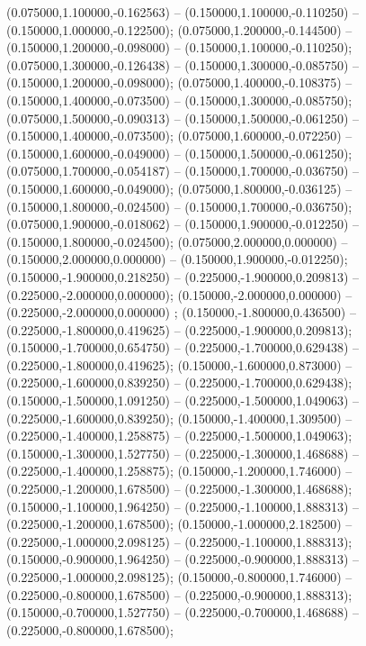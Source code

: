  (0.075000,1.100000,-0.162563) -- (0.150000,1.100000,-0.110250) -- (0.150000,1.000000,-0.122500);
 (0.075000,1.200000,-0.144500) -- (0.150000,1.200000,-0.098000) -- (0.150000,1.100000,-0.110250);
 (0.075000,1.300000,-0.126438) -- (0.150000,1.300000,-0.085750) -- (0.150000,1.200000,-0.098000);
 (0.075000,1.400000,-0.108375) -- (0.150000,1.400000,-0.073500) -- (0.150000,1.300000,-0.085750);
 (0.075000,1.500000,-0.090313) -- (0.150000,1.500000,-0.061250) -- (0.150000,1.400000,-0.073500);
 (0.075000,1.600000,-0.072250) -- (0.150000,1.600000,-0.049000) -- (0.150000,1.500000,-0.061250);
 (0.075000,1.700000,-0.054187) -- (0.150000,1.700000,-0.036750) -- (0.150000,1.600000,-0.049000);
 (0.075000,1.800000,-0.036125) -- (0.150000,1.800000,-0.024500) -- (0.150000,1.700000,-0.036750);
 (0.075000,1.900000,-0.018062) -- (0.150000,1.900000,-0.012250) -- (0.150000,1.800000,-0.024500);
 (0.075000,2.000000,0.000000) -- (0.150000,2.000000,0.000000) -- (0.150000,1.900000,-0.012250);
 (0.150000,-1.900000,0.218250) -- (0.225000,-1.900000,0.209813) -- (0.225000,-2.000000,0.000000);
 (0.150000,-2.000000,0.000000) -- (0.225000,-2.000000,0.000000) ;
 (0.150000,-1.800000,0.436500) -- (0.225000,-1.800000,0.419625) -- (0.225000,-1.900000,0.209813);
 (0.150000,-1.700000,0.654750) -- (0.225000,-1.700000,0.629438) -- (0.225000,-1.800000,0.419625);
 (0.150000,-1.600000,0.873000) -- (0.225000,-1.600000,0.839250) -- (0.225000,-1.700000,0.629438);
 (0.150000,-1.500000,1.091250) -- (0.225000,-1.500000,1.049063) -- (0.225000,-1.600000,0.839250);
 (0.150000,-1.400000,1.309500) -- (0.225000,-1.400000,1.258875) -- (0.225000,-1.500000,1.049063);
 (0.150000,-1.300000,1.527750) -- (0.225000,-1.300000,1.468688) -- (0.225000,-1.400000,1.258875);
 (0.150000,-1.200000,1.746000) -- (0.225000,-1.200000,1.678500) -- (0.225000,-1.300000,1.468688);
 (0.150000,-1.100000,1.964250) -- (0.225000,-1.100000,1.888313) -- (0.225000,-1.200000,1.678500);
 (0.150000,-1.000000,2.182500) -- (0.225000,-1.000000,2.098125) -- (0.225000,-1.100000,1.888313);
 (0.150000,-0.900000,1.964250) -- (0.225000,-0.900000,1.888313) -- (0.225000,-1.000000,2.098125);
 (0.150000,-0.800000,1.746000) -- (0.225000,-0.800000,1.678500) -- (0.225000,-0.900000,1.888313);
 (0.150000,-0.700000,1.527750) -- (0.225000,-0.700000,1.468688) -- (0.225000,-0.800000,1.678500);

